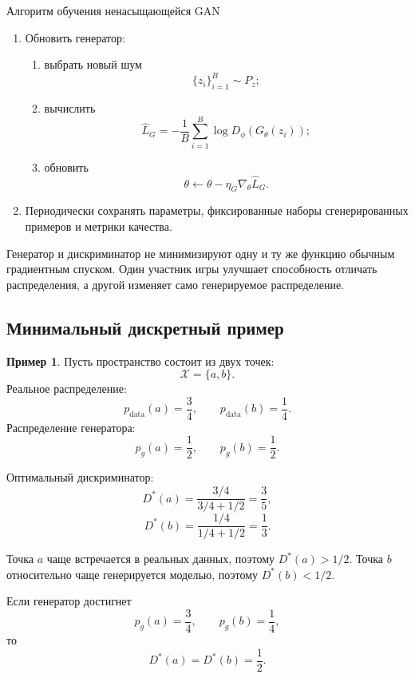 \documentclass[12pt,a4paper]{article}
\numberwithin{equation}{section}
\theoremstyle{definition}
\newtheorem{example}[theorem]{Пример}
\theoremstyle{remark}
\begin{document}
\begin{algobox}{Алгоритм обучения ненасыщающейся GAN}
\begin{enumerate}
\begin{enumerate}
        \item Обновить генератор:
        \begin{enumerate}
            \item выбрать новый шум
            \[
                \{z_i\}_{i=1}^{B}\sim P_z;
            \]
            \item вычислить
            \[
                \widehat{L}_G
                =
                -\frac{1}{B}
                \sum_{i=1}^{B}
                \log D_\phi(G_\theta(z_i));
            \]
            \item обновить
            \[
                \theta
                \leftarrow
                \theta-\eta_G\nabla_\theta\widehat{L}_G.
            \]
        \end{enumerate}

        \item Периодически сохранять параметры, фиксированные наборы
        сгенерированных примеров и метрики качества.
    \end{enumerate}
\end{enumerate}
\end{algobox}

Генератор и дискриминатор не минимизируют одну и ту же функцию обычным
градиентным спуском. Один участник игры улучшает способность отличать
распределения, а другой изменяет само генерируемое распределение.

\subsection{Минимальный дискретный пример}

\begin{example}
Пусть пространство состоит из двух точек:
\[
    \mathcal{X}=\{a,b\}.
\]
Реальное распределение:
\[
    p_{\mathrm{data}}(a)=\frac{3}{4},
    \qquad
    p_{\mathrm{data}}(b)=\frac{1}{4}.
\]
Распределение генератора:
\[
    p_g(a)=\frac{1}{2},
    \qquad
    p_g(b)=\frac{1}{2}.
\]

Оптимальный дискриминатор:
\[
    D^*(a)
    =
    \frac{
        3/4
    }{
        3/4+1/2
    }
    =
    \frac{3}{5},
\]
\[
    D^*(b)
    =
    \frac{
        1/4
    }{
        1/4+1/2
    }
    =
    \frac{1}{3}.
\]

Точка \(a\) чаще встречается в реальных данных, поэтому
\(D^*(a)>1/2\). Точка \(b\) относительно чаще генерируется моделью,
поэтому \(D^*(b)<1/2\).

Если генератор достигнет
\[
    p_g(a)=\frac{3}{4},
    \qquad
    p_g(b)=\frac{1}{4},
\]
то
\[
    D^*(a)=D^*(b)=\frac{1}{2}.
\]
\end{example}
\end{document}
